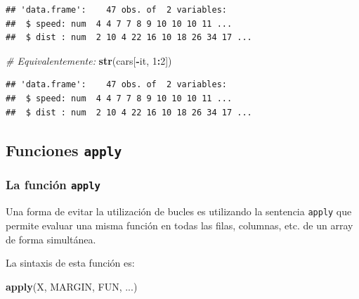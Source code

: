 \documentclass[]{book}
\newenvironment{Shaded}{\begin{snugshade}}{\end{snugshade}}
\newcommand{\KeywordTok}[1]{\textcolor[rgb]{0.13,0.29,0.53}{\textbf{#1}}}
\newcommand{\DecValTok}[1]{\textcolor[rgb]{0.00,0.00,0.81}{#1}}
\newcommand{\CommentTok}[1]{\textcolor[rgb]{0.56,0.35,0.01}{\textit{#1}}}
\newcommand{\OperatorTok}[1]{\textcolor[rgb]{0.81,0.36,0.00}{\textbf{#1}}}
\newcommand{\NormalTok}[1]{#1}
\begin{document}
\begin{verbatim}
## 'data.frame':    47 obs. of  2 variables:
##  $ speed: num  4 4 7 7 8 9 10 10 10 11 ...
##  $ dist : num  2 10 4 22 16 10 18 26 34 17 ...
\end{verbatim}

\begin{Shaded}
\begin{Highlighting}[]
\CommentTok{# Equivalentemente:}
\KeywordTok{str}\NormalTok{(cars[}\OperatorTok{-}\NormalTok{it, }\DecValTok{1}\OperatorTok{:}\DecValTok{2}\NormalTok{])}
\end{Highlighting}
\end{Shaded}

\begin{verbatim}
## 'data.frame':    47 obs. of  2 variables:
##  $ speed: num  4 4 7 7 8 9 10 10 10 11 ...
##  $ dist : num  2 10 4 22 16 10 18 26 34 17 ...
\end{verbatim}

\begin{Shaded}
\end{Shaded}

\subsection{\texorpdfstring{Funciones
\texttt{apply}}{Funciones apply}}\label{funciones-apply}

\subsubsection{\texorpdfstring{La función
\texttt{apply}}{La función apply}}\label{la-funciuxf3n-apply}

Una forma de evitar la utilización de bucles es utilizando la sentencia
\texttt{apply} que permite evaluar una misma función en todas las filas,
columnas, etc. de un array de forma simultánea.

La sintaxis de esta función es:

\begin{Shaded}
\begin{Highlighting}[]
\KeywordTok{apply}\NormalTok{(X, MARGIN, FUN, ...)}
\end{Highlighting}
\end{Shaded}
\end{document}
